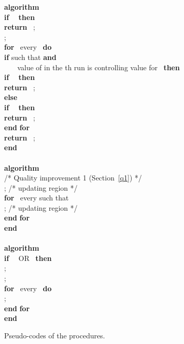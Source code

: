 \documentclass[conference]{IEEEtran} \usepackage{times}
\newcommand{\ALGORITHM}{\textbf{algorithm} }
\newcommand{\AND}{\textbf{and} }
\newcommand{\ELSE}{\textbf{else} }
\newcommand{\END}{\textbf{end} }
\newcommand{\DO}{\textbf{do} }
\newcommand{\FOR}{\textbf{for} }
\newcommand{\IF}{\textbf{if} }
\newcommand{\RETURN}{\textbf{return} }
\newcommand{\THEN}{\textbf{then} }
\begin{document}
\begin{figure}[t!]
\begin{center}
{\begin{tabbing}
\ALGORITHM  \\ 
\> \IF \  \ \THEN \\
\> \> \RETURN \ ; \\

\> ; \\
\> \FOR \ every  \ \DO \\
\> \> \IF  such that  \AND \\
\> \> ~~~ value of  in the th run is controlling value for  \ \THEN \\
\> \> \> \IF \  \ \THEN \\
\> \> \> \> \RETURN \ ; \\
\> \> \> \ELSE \\
\> \> \> \> \IF \  \ \THEN \\
\> \> \> \> \> \RETURN \ ; \\
\> \END \FOR \\
\> \RETURN \ ; \\
\END \\ \\ 

\ALGORITHM  \\ 
\> /* Quality improvement 1 (Section~\ref{q1}) */ \\
\> ; /* updating region  */ \\
\> \FOR \ every  such that  \\
\> \> ; /* updating region  */  \\
\> \END \FOR \\
\END \\ \\

\ALGORITHM  \\ 
\> \IF \  \ OR  \ \THEN \\
\> \> ; \\
\> \> ; \\
\> \> \FOR \ every  \ \DO \\
\> \> \> ; \\
\> \> \END \FOR \\
\END 
\end{tabbing}
}
\caption{Pseudo-codes of the procedures.}\label{code1} 
\end{center}
\end{figure}
\end{document}
